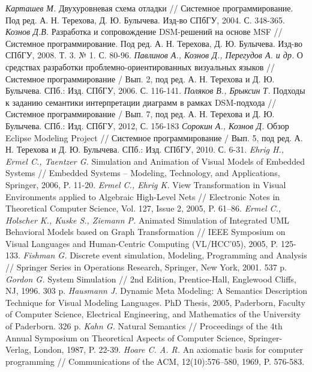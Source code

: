 \documentclass[a5paper]{article}
\begin{document}
\begin{thebibliography}{9001}
 \emph{Карташев М.} Двухуровневая схема отладки // Системное программирование. Под ред. А. Н. Терехова, Д. Ю. Булычева. Изд-во СПбГУ, 2004. С. 348-365.
 \emph{Кознов Д.В.} Разработка и сопровождение DSM-решений на основе MSF // Системное программирование. Под ред. А. Н. Терехова, Д. Ю. Булычева. Изд-во СПбГУ, 2008. Т. 3. № 1. С. 80-96.
 \emph{Павлинов А., Кознов Д., Перегудов А. и др.} О средствах разработки проблемно-ориентированных визуальных языков // Системное программирование / Вып. 2, под ред. А. Н. Терехова и Д. Ю. Булычева. СПб.: Изд. СПбГУ, 2006. С. 116-141.
 \emph{Поляков В., Брыксин Т.} Подходы к заданию семантики интерпретации диаграмм в рамках DSM-подхода // Системное программирование / Вып. 7, под ред. А. Н. Терехова и Д. Ю. Булычева. СПб.: Изд. СПбГУ, 2012, С. 156-183 
 \emph{Сорокин А., Кознов Д.} Обзор Eclipse Modeling Project // Системное программирование / Вып. 5, под ред. А. Н. Терехова и Д. Ю. Булычева. СПб.: Изд. СПбГУ, 2010. С. 6-31.
 \emph{Ehrig H., Ermel C., Taentzer G.} Simulation and Animation of Visual Models of Embedded Systems // Embedded Systems – Modeling, Technology, and Applications, Springer, 2006, P. 11-20.
 \emph{Ermel C., Ehrig K.} View Transformation in Visual Environments applied to Algebraic High-Level Nets // Electronic Notes in Theoretical Computer Science, Vol. 127, Issue 2, 2005, P. 61–86.
 \emph{Ermel C., Holscher K., Kuske S., Ziemann P.} Animated Simulation of Integrated UML Behavioral Models based on Graph Transformation // IEEE Symposium on Visual Languages and Human-Centric Computing (VL/HCC'05), 2005, P. 125-133.
 \emph{Fishman G.} Discrete event simulation, Modeling, Programming and Analysis // Springer Series in Operations Research, Springer, New York, 2001. 537 p.
 \emph{Gordon G.} System Simulation // 2nd Edition, Prentice-Hall, Englewood Cliffs, NJ, 1996. 303 p.
 \emph{Hausmann J.} Dynamic Meta Modeling: A Semantics Description Technique for Visual Modeling Languages. PhD Thesis, 2005, Paderborn, Faculty of Computer Science, Electrical Engineering, and Mathematics of the University of Paderborn. 326 p.
 \emph{Kahn G.} Natural Semantics // Proceedings of the 4th Annual Symposium on Theoretical Aspects of Computer Science, Springer-Verlag, London, 1987, P. 22-39.
 \emph{Hoare C. A. R.} An axiomatic basis for computer programming // Communications of the ACM, 12(10):576–580, 1969, P. 576-583.

\end{thebibliography}
\end{document}
